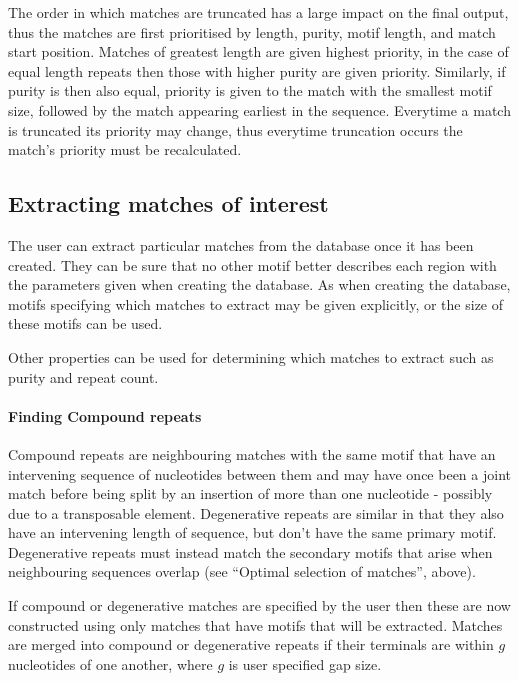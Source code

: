 \documentclass[a4paper]{article}
\begin{document}
The order in which matches are truncated has a large impact on the final output, thus the matches are first prioritised by length, purity, motif length, and match start position. Matches of greatest length are given highest priority, in the case of equal length repeats then those with higher purity are given priority. Similarly, if purity is then also equal, priority is given to the match with the smallest motif size, followed by the match appearing earliest in the sequence. Everytime a match is truncated its priority may change, thus everytime truncation occurs the match's priority must be recalculated.

\subsection{Extracting matches of interest}

The user can extract particular matches from the database once it has been created. They can be sure that no other motif better describes each region with the parameters given when creating the database. As when creating the database, motifs specifying which matches to extract may be given explicitly, or the size of these motifs can be used.

Other properties can be used for determining which matches to extract such as purity and repeat count.

\paragraph{Finding Compound repeats}

Compound repeats are neighbouring matches with the same motif that have an intervening sequence of nucleotides between them and may have once been a joint match before being split by an insertion of more than one nucleotide - possibly due to a transposable element. Degenerative repeats are similar in that they also have an intervening length of sequence, but don't have the same primary motif. Degenerative repeats must instead match the secondary motifs that arise when neighbouring sequences overlap (see ``Optimal selection of matches'', above).

If compound or degenerative matches are specified by the user then these are now constructed using only matches that have motifs that will be extracted. Matches are merged into compound or degenerative repeats if their terminals are within $g$ nucleotides of one another, where $g$ is user specified gap size.
\end{document}
